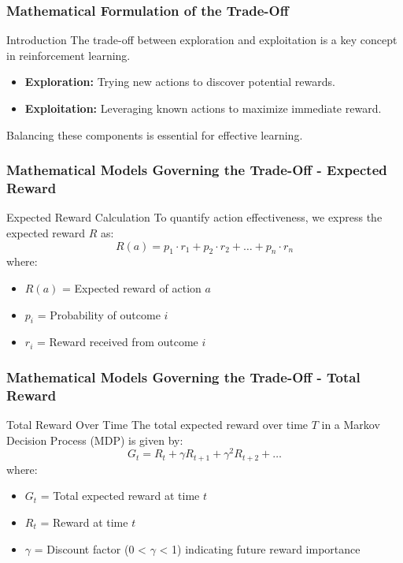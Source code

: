 \documentclass[aspectratio=169]{beamer}
\begin{document}
\begin{frame}[fragile]
    \frametitle{Mathematical Formulation of the Trade-Off}
    \begin{block}{Introduction}
        The trade-off between exploration and exploitation is a key concept in reinforcement learning.
        \begin{itemize}
            \item \textbf{Exploration:} Trying new actions to discover potential rewards.
            \item \textbf{Exploitation:} Leveraging known actions to maximize immediate reward.
        \end{itemize}
        Balancing these components is essential for effective learning.
    \end{block}
\end{frame}

\begin{frame}[fragile]
    \frametitle{Mathematical Models Governing the Trade-Off - Expected Reward}
    \begin{block}{Expected Reward Calculation}
        To quantify action effectiveness, we express the expected reward \( R \) as:
        \begin{equation}
            R(a) = p_1 \cdot r_1 + p_2 \cdot r_2 + \ldots + p_n \cdot r_n
        \end{equation}
        where:
        \begin{itemize}
            \item \( R(a) \) = Expected reward of action \( a \)
            \item \( p_i \) = Probability of outcome \( i \)
            \item \( r_i \) = Reward received from outcome \( i \)
        \end{itemize}
    \end{block}
\end{frame}

\begin{frame}[fragile]
    \frametitle{Mathematical Models Governing the Trade-Off - Total Reward}
    \begin{block}{Total Reward Over Time}
        The total expected reward over time \( T \) in a Markov Decision Process (MDP) is given by:
        \begin{equation}
            G_t = R_t + \gamma R_{t+1} + \gamma^2 R_{t+2} + \ldots
        \end{equation}
        where:
        \begin{itemize}
            \item \( G_t \) = Total expected reward at time \( t \)
            \item \( R_t \) = Reward at time \( t \)
            \item \( \gamma \) = Discount factor (0 < \( \gamma \) < 1) indicating future reward importance
        \end{itemize}
    \end{block}
\end{frame}
\end{document}
